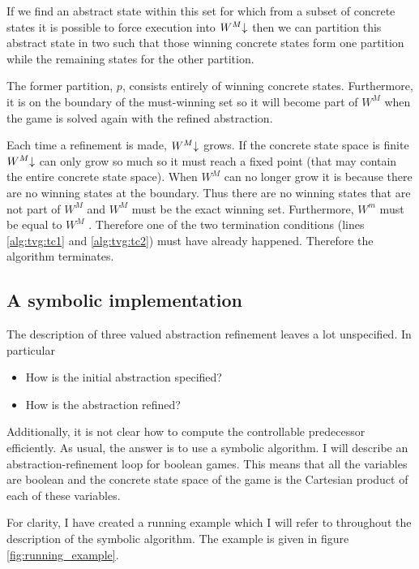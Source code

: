 If we find an abstract state within this set for which from a subset of concrete states it is possible to force execution into $W^M\mathord{\downarrow}$ then we can partition this abstract state in two such that those winning concrete states form one partition while the remaining states for the other partition.

The former partition, $p$, consists entirely of winning concrete states. Furthermore, it is on the boundary of the must-winning set so it will become part of $W^M$ when the game is solved again with the refined abstraction.

Each time a refinement is made, $W^M\mathord{\downarrow}$ grows. If the concrete state space is finite $W^M\mathord{\downarrow}$ can only grow so much so it must reach a fixed point (that may contain the entire concrete state space). When $W^M$ can no longer grow it is because there are no winning states at the boundary. Thus there are no winning states that are not part of $W^M$ and $W^M$ must be the exact winning set. Furthermore, $W^m$ must be equal to $W^M$ . Therefore one of the two termination conditions (lines \ref{alg:tvg:tc1} and \ref{alg:tvg:tc2}) must have already happened. Therefore the algorithm terminates.

\subsection{A symbolic implementation}

The description of three valued abstraction refinement leaves a lot unspecified. In particular

\begin{itemize}
    \item How is the initial abstraction specified?
    \item How is the abstraction refined?
\end{itemize}

Additionally, it is not clear how to compute the controllable predecessor efficiently. As usual, the answer is to use a symbolic algorithm. I will describe an abstraction-refinement loop for boolean games. This means that all the variables are boolean and the concrete state space of the game is the Cartesian product of each of these variables.

For clarity, I have created a running example which I will refer to throughout the description of the symbolic algorithm. The example is given in figure \ref{fig:running_example}.

\lstset{
    numbers=left,
    frame=single
}

